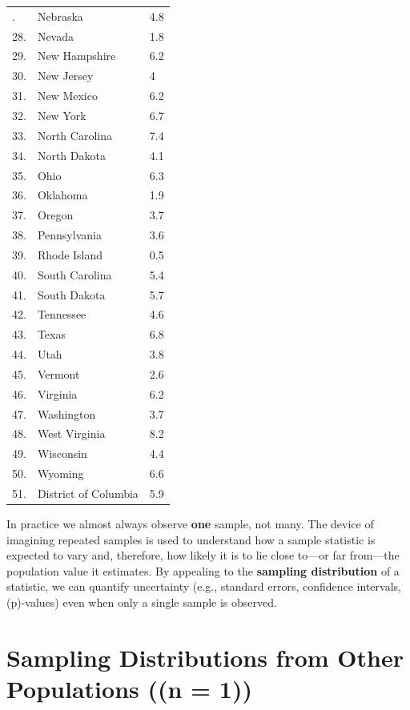\documentclass[
  letterpaper,
  DIV=11,
  numbers=noendperiod]{scrreprt}
\begin{document}
\begin{longtable}[]{@{}lll@{}}
\toprule\noalign{}
\endhead
\bottomrule\noalign{}
\endlastfoot
27. & Nebraska & 4.8 \\
28. & Nevada & 1.8 \\
29. & New Hampshire & 6.2 \\
30. & New Jersey & 4 \\
31. & New Mexico & 6.2 \\
32. & New York & 6.7 \\
33. & North Carolina & 7.4 \\
34. & North Dakota & 4.1 \\
35. & Ohio & 6.3 \\
36. & Oklahoma & 1.9 \\
37. & Oregon & 3.7 \\
38. & Pennsylvania & 3.6 \\
39. & Rhode Island & 0.5 \\
40. & South Carolina & 5.4 \\
41. & South Dakota & 5.7 \\
42. & Tennessee & 4.6 \\
43. & Texas & 6.8 \\
44. & Utah & 3.8 \\
45. & Vermont & 2.6 \\
46. & Virginia & 6.2 \\
47. & Washington & 3.7 \\
48. & West Virginia & 8.2 \\
49. & Wisconsin & 4.4 \\
50. & Wyoming & 6.6 \\
51. & District of Columbia & 5.9 \\
\end{longtable}

In practice we almost always observe \textbf{one} sample, not many. The
device of imagining repeated samples is used to understand how a sample
statistic is expected to vary and, therefore, how likely it is to lie
close to---or far from---the population value it estimates. By appealing
to the \textbf{sampling distribution} of a statistic, we can quantify
uncertainty (e.g., standard errors, confidence intervals, (p)-values)
even when only a single sample is observed.

\section{Sampling Distributions from Other Populations ((n =
1))}\label{sampling-distributions-from-other-populations-n-1}
\end{document}
